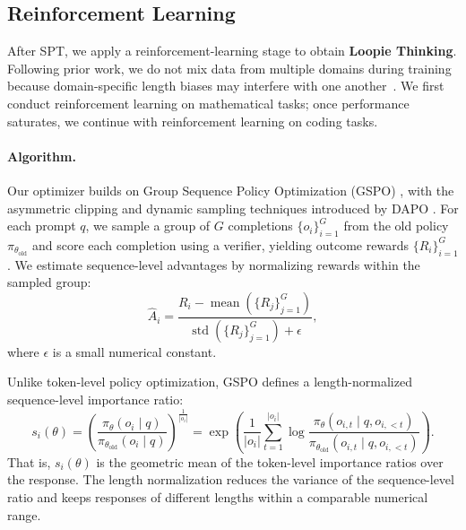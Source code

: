 \subsection{Reinforcement Learning}
\label{sec:rl}

After SPT, we apply a reinforcement-learning stage to obtain \textbf{Loopie Thinking}. Following prior work, we do not mix data from multiple domains during training because domain-specific length biases may interfere with one another~\citep{chen2026acereasonnemotron,liu2026acereasonnemotron}. We first conduct reinforcement learning on mathematical tasks; once performance saturates, we continue with reinforcement learning on coding tasks.


\paragraph{Algorithm.}
Our optimizer builds on Group Sequence Policy Optimization (GSPO) \citep{zheng2025groupsequencepolicyoptimization}, with the asymmetric clipping and dynamic sampling techniques introduced by DAPO \citep{yu2025dapo}. For each prompt $q$, we sample a group of $G$ completions $\{o_i\}_{i=1}^{G}$ from the old policy $\pi_{\theta_{\mathrm{old}}}$ and score each completion using a verifier, yielding outcome rewards $\{R_i\}_{i=1}^{G}$.
We estimate sequence-level advantages by normalizing rewards within the
sampled group:
%
\begin{equation*}
\hat{A}_i
=
\frac{
    R_i - \operatorname{mean}(\{R_j\}_{j=1}^{G})
}{
    \operatorname{std}(\{R_j\}_{j=1}^{G}) + \epsilon
},
\label{eq:rl-group-advantage}
\end{equation*}
%
where $\epsilon$ is a small numerical constant.

Unlike token-level policy optimization, GSPO defines a length-normalized
sequence-level importance ratio:
%
\begin{equation*}
s_i(\theta)
=
\left(
    \frac{\pi_{\theta}(o_i \mid q)}{\pi_{\theta_{\mathrm{old}}}(o_i \mid q)}
\right)^{\frac{1}{|o_i|}}
=
\exp
\left(
    \frac{1}{|o_i|}
    \sum_{t=1}^{|o_i|}
    \log
    \frac{\pi_{\theta}(o_{i,t} \mid q, o_{i,<t})}{\pi_{\theta_{\mathrm{old}}}(o_{i,t} \mid q, o_{i,<t})}
\right).
\end{equation*}
%
That is, $s_i(\theta)$ is the geometric mean of the token-level
importance ratios over the response. The length normalization reduces
the variance of the sequence-level ratio and keeps responses of different
lengths within a comparable numerical range.

